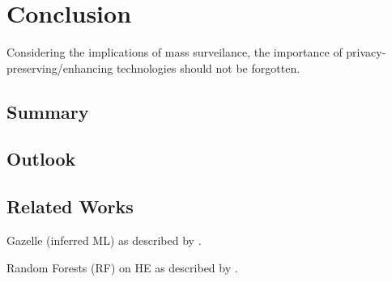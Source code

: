 \chapter{Conclusion}
\label{chap:conclusion}

Considering the implications of mass surveilance, the importance of privacy-preserving/enhancing technologies should not be forgotten.

\section{Summary}

\section{Outlook}

\section{Related Works}

Gazelle (inferred ML) as described by \cite{2018-gazelle}.

Random Forests (RF) on HE as described by \cite{2020-cryptotree}.
